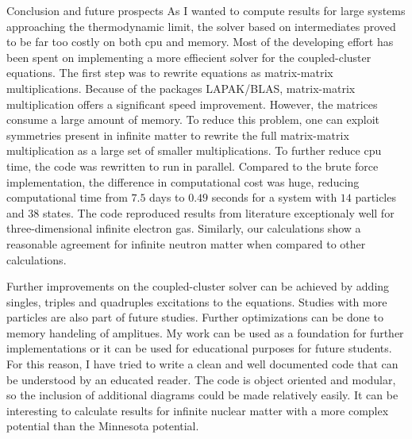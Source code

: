 \documentclass[twoside,english]{uiofysmaster}
\begin{document}
\begin{chapter}{Conclusion and future prospects}
  As I wanted to compute results for large systems approaching the
  thermodynamic limit, the solver based on intermediates proved to be
  far too costly on both cpu and memory. Most of the developing effort
  has been spent on implementing a more effiecient solver for the
  coupled-cluster equations. The first step was to rewrite equations
  as matrix-matrix multiplications. Because of the packages
  LAPAK/BLAS, matrix-matrix multiplication offers a significant speed
  improvement. However, the matrices consume a large amount of
  memory. To reduce this problem, one can exploit symmetries present
  in infinite matter to rewrite the full matrix-matrix multiplication
  as a large set of smaller multiplications. To further reduce cpu
  time, the code was rewritten to run in parallel. Compared to the
  brute force implementation, the difference in computational cost was
  huge, reducing computational time from $7.5$ days to $0.49$ seconds
  for a system with $14$ particles and $38$ states. The code
  reproduced results from literature exceptionaly well for
  three-dimensional infinite electron gas. Similarly, our calculations show a reasonable agreement for
  infinite neutron matter when compared to other calculations.

  Further improvements on the coupled-cluster solver can be achieved
  by adding singles, triples and quadruples excitations to the
  equations. Studies with more particles are also part of future studies.
  Further optimizations can be done to memory handeling of
  amplitues. My work can be used as a foundation for further
  implementations or it can be used for educational purposes for
  future students. For this reason, I have tried to write a clean and
  well documented code that can be understood by an educated
  reader. The code is object oriented and modular, so the inclusion of additional diagrams could be made relatively easily. 
  It can be interesting to calculate results for infinite
  nuclear matter with a more complex potential than the Minnesota
  potential.
\end{chapter}


\medskip
\end{document}
